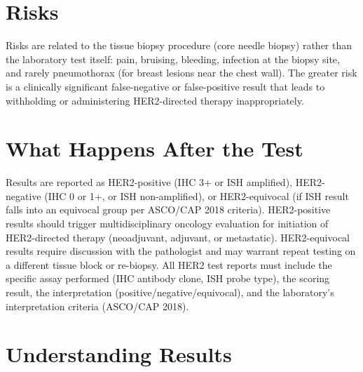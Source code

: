\section*{Risks}
Risks are related to the tissue biopsy procedure (core needle biopsy) rather than the laboratory test itself: pain, bruising, bleeding, infection at the biopsy site, and rarely pneumothorax (for breast lesions near the chest wall). The greater risk is a clinically significant false-negative or false-positive result that leads to withholding or administering HER2-directed therapy inappropriately.

\section*{What Happens After the Test}
Results are reported as HER2-positive (IHC 3+ or ISH amplified), HER2-negative (IHC 0 or 1+, or ISH non-amplified), or HER2-equivocal (if ISH result falls into an equivocal group per ASCO/CAP 2018 criteria). HER2-positive results should trigger multidisciplinary oncology evaluation for initiation of HER2-directed therapy (neoadjuvant, adjuvant, or metastatic). HER2-equivocal results require discussion with the pathologist and may warrant repeat testing on a different tissue block or re-biopsy. All HER2 test reports must include the specific assay performed (IHC antibody clone, ISH probe type), the scoring result, the interpretation (positive/negative/equivocal), and the laboratory's interpretation criteria (ASCO/CAP 2018).

\section*{Understanding Results}

